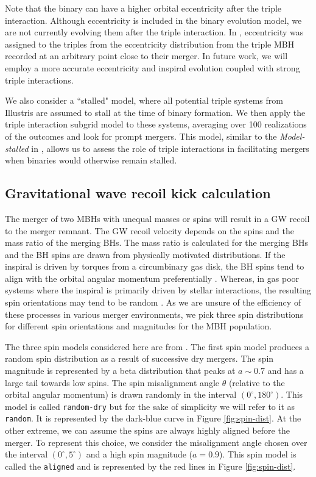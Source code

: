 \documentclass[twocolumn,linenumbers]{aastex701}
\begin{document}
Note that the binary can have a higher orbital eccentricity after the triple interaction. Although eccentricity is included in the binary evolution model, we are not currently evolving them after the triple interaction. In \citet{bonetti_post-newtonian_2018}, eccentricity was assigned to the triples from the eccentricity distribution from the triple MBH recorded at an arbitrary point close to their merger. In future work, we will employ a more accurate eccentricity and inspiral evolution coupled with strong triple interactions.

We also consider a ``stalled" model, where all potential triple systems from Illustris are assumed to stall at the time of binary formation. We then apply the triple interaction subgrid model to these systems, averaging over 100 realizations of the outcomes and look for prompt mergers. This model, similar to the \emph{Model-stalled} in \citet{bonetti_post-newtonian_2018}, allows us to assess the role of triple interactions in facilitating mergers when binaries would otherwise remain stalled.

\subsection{Gravitational wave recoil kick calculation}
\label{sec: GW recoil kick}

The merger of two MBHs with unequal masses or spins will result in a GW recoil to the merger remnant. The GW recoil velocity depends on the spins and the mass ratio of the merging BHs.  The mass ratio is calculated for the merging BHs and the BH spins are drawn from physically motivated distributions. If the inspiral is driven by torques from a circumbinary gas disk, the BH spins tend to align with the orbital angular momentum preferentially \citep{Bogdanovic_2007, Dotti2010,Miller_2013}. Whereas, in gas poor systems where the inspiral is primarily driven by stellar interactions, the resulting spin orientations may tend to be random \citep{Merritt_2012}. As we are unsure of the efficiency of these processes in various merger environments, we pick three spin distributions for different spin orientations and magnitudes for the MBH population. 

The three spin models considered here are from \cite{Blecha2016}. The first spin model produces a random spin distribution as a result of successive dry mergers. The spin magnitude is represented by a beta distribution that peaks at $a \sim 0.7$ \citep{Lousto_2012} and has a large tail towards low spins. The spin misalignment angle $\theta$ (relative to the orbital angular momentum) is drawn randomly in the interval $(0^{\circ},180^{\circ})$. This model is called \texttt{random-dry} but for the sake of simplicity we will refer to it as \texttt{random}. It is represented by the dark-blue curve in Figure \ref{fig:spin-dist}. At the other extreme, we can assume the spins are always highly aligned before the merger. To represent this choice, we consider the misalignment angle chosen over the interval $(0^{\circ},5^{\circ})$ and a high spin magnitude ($a = 0.9$). This spin model is called the \texttt{aligned} and is represented by the red lines in Figure \ref{fig:spin-dist}.
\end{document}
